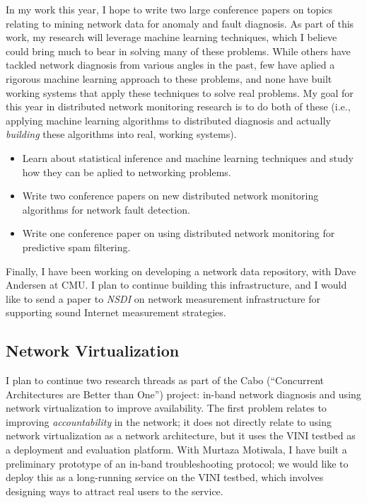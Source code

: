 \begin{sloppypar}
In my work this year, I hope to write two large conference papers on
topics relating to mining network data for anomaly and fault diagnosis.
As part of this work, my research will leverage machine learning
techniques, which I believe could bring much to bear in solving many of
these problems.  While others have tackled network diagnosis from
various angles in the past, few have aplied a rigorous machine learning
approach to these problems, and none have built working systems that
apply these techniques to solve real problems.  My goal for this year in
distributed network monitoring research is to do both of these (i.e.,
applying machine learning algorithms to distributed diagnosis and
actually {\em building} these algorithms into real, working systems).

\begin{itemize}
\itemsep=-1pt
\item Learn about statistical inference and machine learning techniques
  and study how they can be aplied to networking problems.
\item Write two conference papers on new distributed network monitoring
  algorithms for network fault detection.
\item Write one conference paper on using distributed network monitoring
  for predictive spam filtering.
\end{itemize}

Finally, I have been working on developing a network data repository,
with Dave Andersen at CMU.  I plan to continue building this
infrastructure, and I would like to send a paper to {\em NSDI} on
network measurement infrastructure for supporting sound Internet
measurement strategies.

\subsection*{Network Virtualization}

I plan to continue two research threads as part of the Cabo
(``Concurrent Architectures are Better than One'') project: in-band
network diagnosis and using network virtualization to improve
availability.  The first problem relates to improving {\em
accountability} in the network; it does not directly relate to using
network virtualization as a network architecture, but it uses the VINI
testbed as a deployment and evaluation platform.  With Murtaza Motiwala,
I have built a preliminary prototype of an in-band troubleshooting
protocol; we would like to deploy this as a long-running service on the
VINI testbed, which involves designing ways to attract real users to the
service.


\end{sloppypar}
